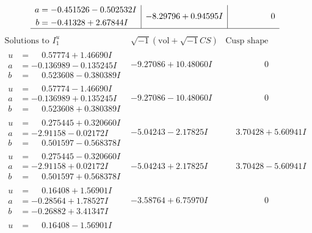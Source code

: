 \documentclass[1p]{elsarticle_modified}
\theoremstyle{definition}
\newcommand{\I}{\sqrt{-1}}
\begin{document}
$$\begin{array}{c|c|c}
\begin{aligned}
a &= -0.451526 - 0.502532 I \\
b &= -0.41328 + 2.67844 I\end{aligned}
 & -8.29796 + 0.94595 I & \phantom{-0.000000 } 0\\
 \hline 
 \end{array}$$\newpage$$\begin{array}{c|c|c}  
\text{Solutions to }I^u_{1}& \I (\text{vol} + \sqrt{-1}CS) & \text{Cusp shape}\\
 \hline 
\begin{aligned}
u &= \phantom{-}0.57774 + 1.46690 I \\
a &= -0.136989 - 0.135245 I \\
b &= \phantom{-}0.523608 - 0.380389 I\end{aligned}
 & -9.27086 + 10.48060 I & \phantom{-0.000000 } 0 \\ \hline\begin{aligned}
u &= \phantom{-}0.57774 - 1.46690 I \\
a &= -0.136989 + 0.135245 I \\
b &= \phantom{-}0.523608 + 0.380389 I\end{aligned}
 & -9.27086 - 10.48060 I & \phantom{-0.000000 } 0 \\ \hline\begin{aligned}
u &= \phantom{-}0.275445 + 0.320660 I \\
a &= -2.91158 - 0.02172 I \\
b &= \phantom{-}0.501597 - 0.568378 I\end{aligned}
 & -5.04243 - 2.17825 I & \phantom{-}3.70428 + 5.60941 I \\ \hline\begin{aligned}
u &= \phantom{-}0.275445 - 0.320660 I \\
a &= -2.91158 + 0.02172 I \\
b &= \phantom{-}0.501597 + 0.568378 I\end{aligned}
 & -5.04243 + 2.17825 I & \phantom{-}3.70428 - 5.60941 I \\ \hline\begin{aligned}
u &= \phantom{-}0.16408 + 1.56901 I \\
a &= -0.28564 + 1.78527 I \\
b &= -0.26882 + 3.41347 I\end{aligned}
 & -3.58764 + 6.75970 I & \phantom{-0.000000 } 0 \\ \hline\begin{aligned}
u &= \phantom{-}0.16408 - 1.56901 I \\

\end{aligned}
\end{array}$$
\end{document}
